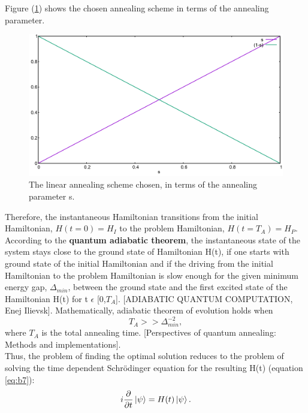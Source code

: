 \documentclass[../main.tex]{subfiles}
\begin{document}
Figure (\ref{fig:b1}) shows the chosen annealing scheme in terms of the annealing parameter.
\begin{figure}[H]
\centering 
\includegraphics[scale=0.3]{Scheme.png}
\caption{The linear annealing scheme chosen, in terms of the annealing parameter s.}
\label{fig:b1}
\end{figure}
Therefore, the instantaneous Hamiltonian transitions from the initial Hamiltonian, $H(t=0)=H_I$ to the problem Hamiltonian, $H(t=T_A)=H_P$. \\

According to the \textbf{quantum adiabatic theorem}, the instantaneous state of the system stays close to the ground state of Hamiltonian H(t), if one starts with ground state of the initial Hamiltonian and if the driving from the initial Hamiltonian to the problem Hamiltonian is slow enough for the given minimum energy gap, $\Delta_{min}$, between the ground state and the first excited state of the Hamiltonian H(t) for t $\epsilon$ [0,$T_A$]. [ADIABATIC QUANTUM COMPUTATION, Enej Ilievsk]. Mathematically, adiabatic theorem of evolution holds when 
\begin{equation}
T_A>> {\Delta}_{min}^{-2}, \label{eq:b8}
\end{equation}
where $T_A$ is the total annealing time. [Perspectives of quantum annealing: Methods and implementations].\\
Thus, the problem of finding the optimal solution reduces to the problem of solving the time dependent Schr{\"o}dinger equation for the resulting H(t) (equation \ref{eq:b7}):
\begin{equation}
i\frac{\partial}{\partial t}\ket{\psi}=H(t)\ket{\psi}.    \label{eq:b9}
\end{equation}
\end{document}
